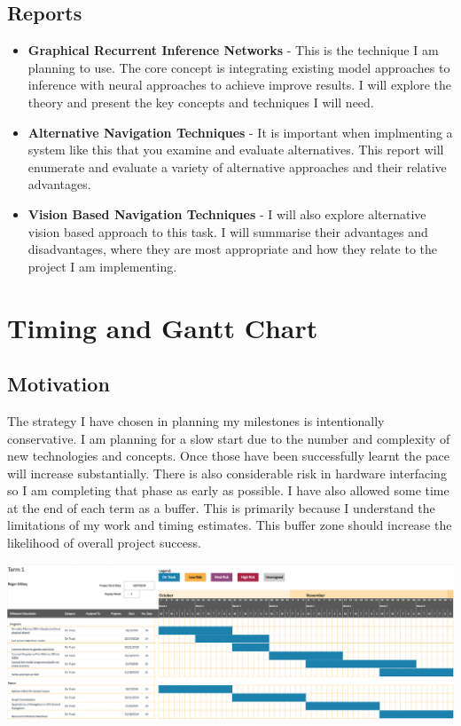 \documentclass[]{final_report}
\begin{document}
\subsection{Reports}
\begin{itemize}
  \item \textbf{Graphical Recurrent Inference Networks} - This is the technique I am planning to use. The core concept is integrating existing model approaches to inference with neural approaches to achieve improve results. I will explore the theory and present the key concepts and techniques I will need.
  \item \textbf{Alternative Navigation Techniques} - It is important when implmenting a system like this that you examine and evaluate alternatives. This report will enumerate and evaluate a variety of alternative approaches and their relative advantages.
  \item \textbf{Vision Based Navigation Techniques} - I will also explore alternative vision based approach to this task. I will summarise their advantages and disadvantages, where they are most appropriate and how they relate to the project I am implementing.
\end{itemize}

\newpage

\section{Timing and Gantt Chart}

\subsection{Motivation}
The strategy I have chosen in planning my milestones is intentionally conservative. I am planning for a slow start due to the number and complexity of new technologies and concepts. Once those have been successfully learnt the pace will increase substantially.
There is also considerable risk in hardware interfacing so I am completing that phase as early as possible.
\linebreak
\linebreak
I have also allowed some time at the end of each term as a buffer. This is primarily because I understand the limitations of my work and timing estimates. This buffer zone should increase the likelihood of overall project success.
\vspace{20pt}

\includegraphics[width=\textwidth]{Term1GanttChart.png}
\end{document}
